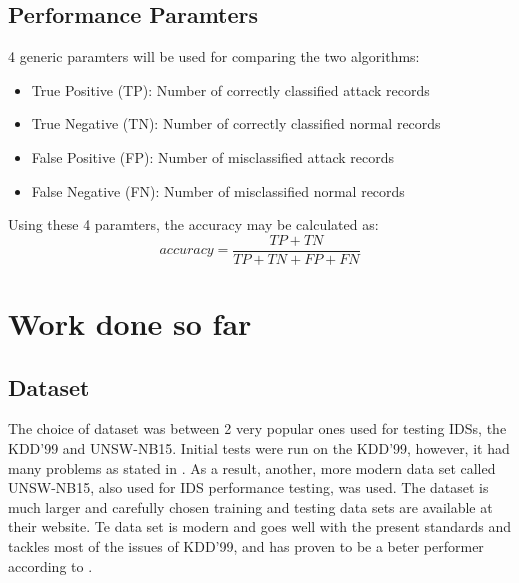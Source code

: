 \documentclass[a4paper,12pt]{article}
\begin{document}
        \subsection{Performance Paramters}
        4 generic paramters will be used for comparing the two algorithms:
        \begin{itemize}
            \item True Positive (TP): Number of correctly classified attack records
            \item True Negative (TN): Number of correctly classified normal records
            \item False Positive (FP): Number of misclassified attack records
            \item False Negative (FN): Number of misclassified normal records
        \end{itemize}
        Using these 4 paramters, the accuracy may be calculated as:
        \begin{equation}
            accuracy = \frac {TP + TN} {TP + TN + FP + FN}
        \end{equation}

	\section{Work done so far}
        \subsection{Dataset}
        The choice of dataset was between 2 very popular ones used for testing IDSs, the KDD'99 and UNSW-NB15. Initial tests were run on the KDD'99, however, it had many problems as stated in \cite{unsw15}. As a result, another, more modern data set called UNSW-NB15, also used for IDS performance testing, was used. The dataset is much larger and carefully chosen training and testing data sets are available at their website. Te data set is modern and goes well with the present standards and tackles most of the issues of KDD’99, and has proven to be a beter performer according to \cite{unsw15}.
\end{document}
